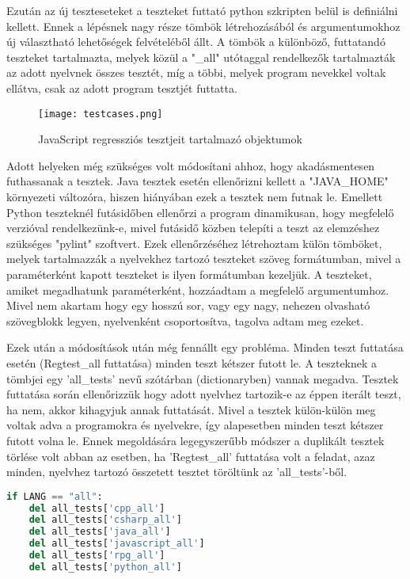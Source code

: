 Ezután az új teszteseteket a teszteket futtató python szkripten belül is definiálni kellett.
Ennek a lépésnek nagy része tömbök létrehozásából és argumentumokhoz új választható lehetőségek felvételéből állt. A tömbök a különböző, futtatandó teszteket tartalmazta, melyek közül a "\_all" utótaggal rendelkezők tartalmazták az adott nyelvnek összes tesztét, míg a többi, melyek program nevekkel voltak ellátva, csak az adott program tesztjét futtatta.

\begin{figure}[!htbp]
    \caption{JavaScript regressziós tesztjeit tartalmazó objektumok}\label{fig:testcases}
    \centering
    \texttt{[image: testcases.png]}
\end{figure}

Adott helyeken még szükséges volt módosítani ahhoz, hogy akadásmentesen futhassanak a tesztek. Java tesztek esetén ellenőrizni kellett a "JAVA\_HOME" környezeti változóra, hiszen hiányában ezek a tesztek nem futnak le. Emellett Python teszteknél futásidőben ellenőrzi a program dinamikusan, hogy megfelelő verzióval rendelkezünk-e, mivel futásidő közben telepíti a teszt az elemzéshez szükséges "pylint" szoftvert.
Ezek ellenőrzéséhez létrehoztam külön tömböket, melyek tartalmazzák a nyelvekhez tartozó teszteket szöveg formátumban, mivel a paraméterként kapott teszteket is ilyen formátumban kezeljük.
A teszteket, amiket megadhatunk paraméterként, hozzáadtam a megfelelő argumentumhoz. Mivel nem akartam hogy egy hosszú sor, vagy egy nagy, nehezen olvasható szövegblokk legyen, nyelvenként csoportosítva, tagolva adtam meg ezeket.

Ezek után a módosítások után még fennállt egy probléma. Minden teszt futtatása esetén (Regtest\_all futtatása) minden teszt kétszer futott le. A teszteknek a tömbjei egy 'all\_tests' nevű szótárban (dictionaryben) vannak megadva. Tesztek futtatása során ellenőrizzük hogy adott nyelvhez tartozik-e az éppen iterált teszt, ha nem, akkor kihagyjuk annak futtatását. Mivel a tesztek külön-külön meg voltak adva a programokra és nyelvekre, így alapesetben minden teszt kétszer futott volna le. Ennek megoldására legegyszerűbb módszer a duplikált tesztek törlése volt abban az esetben, ha 'Regtest\_all' futtatása volt a feladat, azaz minden, nyelvhez tartozó összetett tesztet töröltünk az 'all\_tests'-ből. 


\begin{lstlisting}[caption={CMake célpontok JavaScript teszteléshez},label={lst:abs-computedfiltering}, language={Python}]
if LANG == "all":
    del all_tests['cpp_all']
    del all_tests['csharp_all']
    del all_tests['java_all']
    del all_tests['javascript_all']
    del all_tests['rpg_all']
    del all_tests['python_all']
\end{lstlisting}